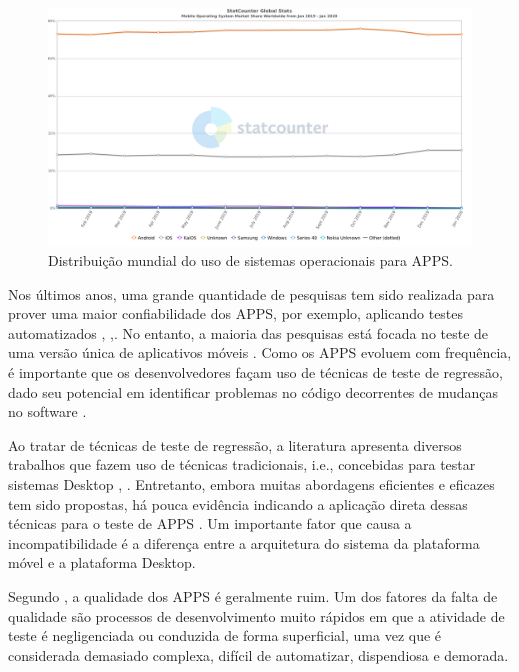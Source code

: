 \begin{figure}
    \centering
    \includegraphics[width=1.\textwidth]{images/StatCounter-os_2020.png}
    \caption{Distribuição mundial do uso de sistemas operacionais para \ac{APPS}.}
    \label{fig:marketShare}
\end{figure}


Nos últimos anos, uma grande quantidade de pesquisas tem sido realizada para prover uma maior confiabilidade dos \ac{APPS}, por exemplo, aplicando testes automatizados \cite{7927972}, \cite{8424973},\cite{8453877}. No entanto, a maioria das pesquisas está focada no teste de uma versão única de aplicativos móveis \cite{Do2016RedroidAR}. Como os \ac{APPS} evoluem com frequência, é importante que os desenvolvedores façam uso de técnicas de teste de regressão, dado seu potencial em identificar problemas no código decorrentes de mudanças no software \cite{8377661}.


Ao tratar de técnicas de teste de regressão, a literatura apresenta diversos trabalhos que fazem uso de técnicas tradicionais, i.e., concebidas para testar sistemas Desktop \cite{536955}, \cite{ENGSTROM201014}. Entretanto, embora muitas abordagens eficientes e eficazes tem sido propostas, há pouca evidência indicando a aplicação direta dessas técnicas para o teste de \ac{APPS} \cite{Do2016RedroidAR}. Um importante fator que causa a incompatibilidade é a diferença entre a arquitetura do sistema da plataforma móvel e a plataforma Desktop.

Segundo , a qualidade dos \ac{APPS} é geralmente ruim. Um dos fatores da falta de qualidade são processos de desenvolvimento muito rápidos em que a atividade de teste é negligenciada ou conduzida de forma superficial, uma vez que é considerada demasiado complexa, difícil de automatizar, dispendiosa e demorada. 

